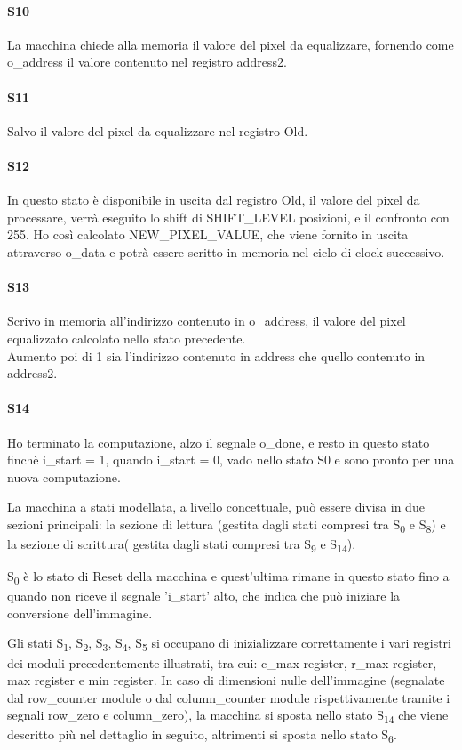 \paragraph{S10}
La macchina chiede alla memoria il valore del pixel da equalizzare, fornendo come o\_address il valore contenuto nel registro address2.
\paragraph{S11}
Salvo il valore del pixel da equalizzare nel registro Old.
\paragraph{S12}
In questo stato è disponibile in uscita dal registro Old, il valore del pixel da processare, verrà eseguito lo shift di SHIFT\_LEVEL posizioni, e il confronto con 255. Ho così calcolato NEW\_PIXEL\_VALUE, che viene fornito in uscita attraverso o\_data e potrà essere scritto in memoria nel ciclo di clock successivo.
\paragraph{S13}
Scrivo in memoria all'indirizzo contenuto in o\_address, il valore del pixel equalizzato calcolato nello stato precedente.\\
Aumento poi di 1 sia l'indirizzo contenuto in address che quello contenuto in address2.
\paragraph{S14}
Ho terminato la computazione, alzo il segnale o\_done, e resto in questo stato finchè i\_start = 1, quando i\_start = 0, vado nello stato S0 e sono pronto per una nuova computazione.


La macchina a stati modellata, a livello concettuale, può essere divisa in due sezioni principali: la sezione di lettura (gestita dagli stati compresi tra S\textsubscript{0} e S\textsubscript{8}) e la sezione di scrittura( gestita dagli stati compresi tra S\textsubscript{9} e S\textsubscript{14}).

S\textsubscript{0} è lo stato di Reset della macchina e quest'ultima rimane in questo stato fino a quando non riceve il segnale 'i\_start' alto, che indica che può iniziare la conversione dell'immagine.

Gli stati S\textsubscript{1}, S\textsubscript{2}, S\textsubscript{3}, S\textsubscript{4}, S\textsubscript{5} si occupano di inizializzare correttamente i vari registri dei moduli precedentemente illustrati, tra cui: c\_max register, r\_max register, max register e min register.
In caso di dimensioni nulle dell'immagine (segnalate dal row\_counter module o dal column\_counter module rispettivamente tramite i segnali row\_zero e column\_zero), la macchina si sposta nello stato S\textsubscript{14} che viene descritto più nel dettaglio in seguito, altrimenti si sposta nello stato S\textsubscript{6}.

